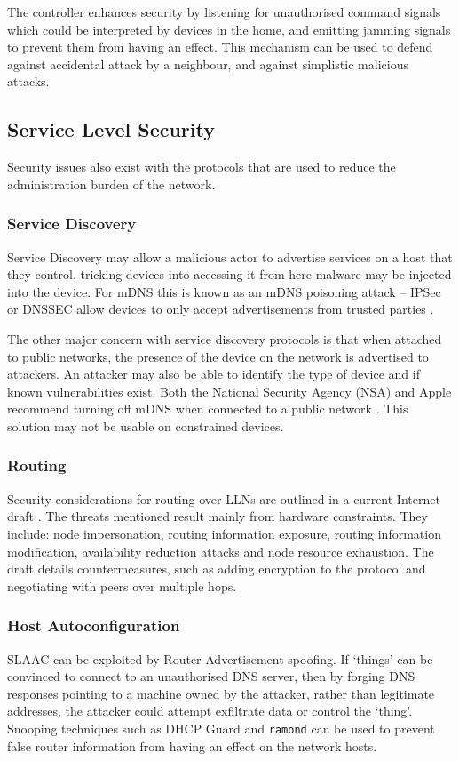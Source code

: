 \documentclass[10pt,journal,compsoc]{IEEEtran}
\begin{document}
The controller enhances security by listening for unauthorised command signals
which could be interpreted by devices in the home, and emitting jamming signals
to prevent them from having an effect. This mechanism can be used to defend
against accidental attack by a neighbour, and against simplistic malicious
attacks. 

\subsection{Service Level Security}
Security issues also exist with the protocols that are used to reduce the
administration burden of the network. 

\subsubsection{Service Discovery}
Service Discovery may allow a malicious actor to advertise services on a host
that they control, tricking devices into accessing it from here malware may be
injected into the device. For mDNS this is known as an mDNS poisoning attack --
IPSec or DNSSEC allow devices to only accept advertisements from trusted
parties \cite{Cheshire2013}. 

The other major concern with service discovery protocols is that when attached
to public networks, the presence of the device on the network is advertised to
attackers. An attacker may also be able to identify the type of device and if
known vulnerabilities exist. Both the National Security Agency (NSA) and Apple
recommend turning off mDNS when connected to a public network
\cite{NSAMacHardening} \cite{MacConfig}. This solution may not be usable on
constrained devices.

\subsubsection{Routing}
Security considerations for routing over LLNs are outlined in a current
Internet draft \cite{Tsao2014}. The threats mentioned result mainly from
hardware constraints. They include: node impersonation, routing information
exposure, routing information modification, availability reduction attacks and
node resource exhaustion. The draft details countermeasures, such as adding
encryption to the protocol and negotiating with peers over multiple hops.

\subsubsection{Host Autoconfiguration}
SLAAC can be exploited by Router Advertisement spoofing. If `things' can be
convinced to connect to an unauthorised DNS server, then by forging DNS
responses pointing to a machine owned by the attacker, rather than legitimate
addresses, the attacker could attempt exfiltrate data or control the `thing'.
Snooping techniques such as DHCP Guard and {\tt ramond} can be used to prevent
false router information from having an effect on the network hosts.
\end{document}
